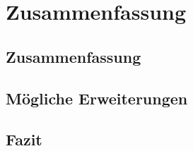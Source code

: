 \chapter{Zusammenfassung}
\label{cha:zusammenfassung}

\section{Zusammenfassung}
\section{Mögliche Erweiterungen}
\section{Fazit}




%
%
%
%
